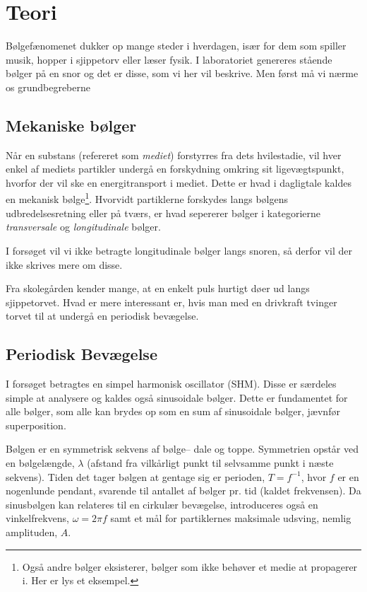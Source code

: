 \documentclass[A2_main.tex]{subfiles}
\begin{document}
\section{Teori}
Bølgefænomenet dukker op mange steder i hverdagen, især for dem som spiller musik, hopper i sjippetorv eller læser fysik. I laboratoriet genereres stående bølger på en snor og det er disse, som vi her vil beskrive. Men først må vi nærme os grundbegreberne
\subsection{Mekaniske bølger}
Når en substans (refereret som \emph{mediet}) forstyrres fra dets hvilestadie, vil hver enkel af mediets partikler undergå en forskydning omkring sit ligevægtspunkt, hvorfor der vil ske en energitransport i mediet. Dette er hvad i dagligtale kaldes en mekanisk bølge\footnote{Også andre bølger eksisterer, bølger som ikke behøver et medie at propagerer i. Her er lys et eksempel.}. Hvorvidt partiklerne forskydes langs bølgens udbredelsesretning eller på tværs, er hvad sepererer bølger i kategorierne \emph{transversale} og \emph{longitudinale} bølger.

I forsøget vil vi ikke betragte longitudinale bølger langs snoren, så derfor vil der ikke skrives mere om disse.

Fra skolegården kender mange, at en enkelt puls hurtigt døer ud langs sjippetorvet. Hvad er mere interessant er, hvis man med en drivkraft tvinger torvet til at undergå en periodisk bevægelse.

\subsection{Periodisk Bevægelse}
I forsøget betragtes en simpel harmonisk oscillator (SHM). Disse er særdeles simple at analysere og kaldes også sinusoidale bølger. Dette er fundamentet for alle bølger, som alle kan brydes op som en sum af sinusoidale bølger, jævnfør superposition.

Bølgen er en symmetrisk sekvens af bølge-- dale og toppe. Symmetrien opstår ved en bølgelængde, $\lambda$ (afstand fra vilkårligt punkt til selvsamme punkt i næste sekvens). Tiden det tager bølgen at gentage sig er perioden, $T=f^{-1}$, hvor $f$ er en nogenlunde pendant, svarende til antallet af bølger pr. tid (kaldet frekvensen). Da sinusbølgen kan relateres til en cirkulær bevægelse, introduceres også en vinkelfrekvens, $\omega = 2\pi f$ samt et mål for partiklernes maksimale udsving, nemlig amplituden, $A$.
\end{document}
